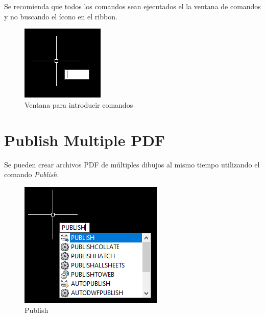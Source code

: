 \documentclass{report}
\begin{document}
Se recomienda que todos los comandos sean ejecutados el la ventana de comandos y no buscando el ícono en el ribbon.

\begin{figure}[H]
	\centering
	\includegraphics[width=0.65\linewidth, height=0.5\textheight,keepaspectratio]{Imagenes/autocad_spacebar01}
	\caption{Ventana para introducir comandos}
	\label{fig:autocadspacebar01}
\end{figure}


\chapter{Publish Multiple PDF}

Se pueden crear archivos PDF de múltiples dibujos al mismo tiempo utilizando el comando \emph{Publish}.

\begin{figure}[H]
	\centering
	\includegraphics[width=0.75\linewidth, height=0.5\textheight,keepaspectratio]{Imagenes/autocad_publish_01}
	\caption{Publish}
	\label{fig:autocadpublish01}
\end{figure}
\end{document}
